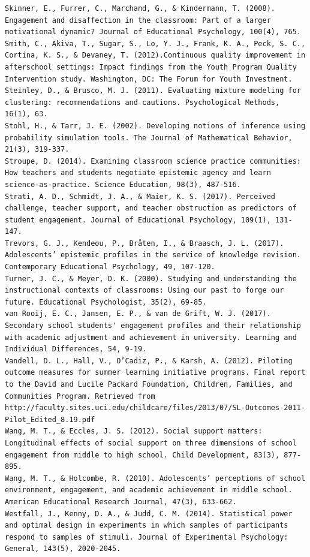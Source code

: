 \documentclass[]{msu-thesis}
\theoremstyle{definition}
\theoremstyle{definition}
\theoremstyle{definition}
\theoremstyle{remark}
\begin{document}
\begin{verbatim}
Skinner, E., Furrer, C., Marchand, G., & Kindermann, T. (2008). Engagement and disaffection in the classroom: Part of a larger motivational dynamic? Journal of Educational Psychology, 100(4), 765.  
Smith, C., Akiva, T., Sugar, S., Lo, Y. J., Frank, K. A., Peck, S. C., Cortina, K. S., & Devaney, T. (2012).Continuous quality improvement in afterschool settings: Impact findings from the Youth Program Quality Intervention study. Washington, DC: The Forum for Youth Investment. 
Steinley, D., & Brusco, M. J. (2011). Evaluating mixture modeling for clustering: recommendations and cautions. Psychological Methods, 16(1), 63.  
Stohl, H., & Tarr, J. E. (2002). Developing notions of inference using probability simulation tools. The Journal of Mathematical Behavior, 21(3), 319-337.  
Stroupe, D. (2014). Examining classroom science practice communities: How teachers and students negotiate epistemic agency and learn science‐as‐practice. Science Education, 98(3), 487-516.  
Strati, A. D., Schmidt, J. A., & Maier, K. S. (2017). Perceived challenge, teacher support, and teacher obstruction as predictors of student engagement. Journal of Educational Psychology, 109(1), 131-147.  
Trevors, G. J., Kendeou, P., Bråten, I., & Braasch, J. L. (2017). Adolescents’ epistemic profiles in the service of knowledge revision. Contemporary Educational Psychology, 49, 107-120.  
Turner, J. C., & Meyer, D. K. (2000). Studying and understanding the instructional contexts of classrooms: Using our past to forge our future. Educational Psychologist, 35(2), 69-85.  
van Rooij, E. C., Jansen, E. P., & van de Grift, W. J. (2017). Secondary school students' engagement profiles and their relationship with academic adjustment and achievement in university. Learning and Individual Differences, 54, 9-19.  
Vandell, D. L., Hall, V., O’Cadiz, P., & Karsh, A. (2012). Piloting outcome measures for summer learning initiative programs. Final report to the David and Lucile Packard Foundation, Children, Families, and Communities Program. Retrieved from http://faculty.sites.uci.edu/childcare/files/2013/07/SL-Outcomes-2011-Pilot_Edited_8.19.pdf  
Wang, M. T., & Eccles, J. S. (2012). Social support matters: Longitudinal effects of social support on three dimensions of school engagement from middle to high school. Child Development, 83(3), 877-895.  
Wang, M. T., & Holcombe, R. (2010). Adolescents’ perceptions of school environment, engagement, and academic achievement in middle school. American Educational Research Journal, 47(3), 633-662.  
Westfall, J., Kenny, D. A., & Judd, C. M. (2014). Statistical power and optimal design in experiments in which samples of participants respond to samples of stimuli. Journal of Experimental Psychology: General, 143(5), 2020-2045.  

\end{verbatim}
\end{document}
